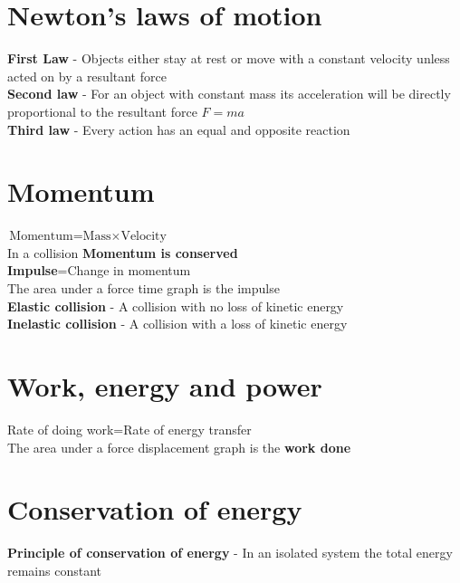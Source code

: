 \documentclass{article}[18pt]
\begin{document}
\section{Newton's laws of motion}
\textbf{First Law} - Objects either stay at rest or move with a constant velocity unless acted on by a resultant force\\
\textbf{Second law} - For an object with constant mass its acceleration will be directly proportional to the resultant force $F=ma$\\
\textbf{Third law} - Every action has an equal and opposite reaction
\section{Momentum}
$\text{Momentum=Mass}\times\text{Velocity}$\\
In a collision \textbf{Momentum is conserved}\\
\textbf{Impulse}=Change in momentum\\
The area under a force time graph is the impulse\\
\textbf{Elastic collision} - A collision with no loss of kinetic energy\\
\textbf{Inelastic collision} - A collision with a loss of kinetic energy
\section{Work, energy and power}
Rate of doing work=Rate of energy transfer\\
The area under a force displacement graph is the \textbf{work done}
\section{Conservation of energy}
\textbf{Principle of conservation of energy} - In an isolated system the total energy remains constant
\end{document}
